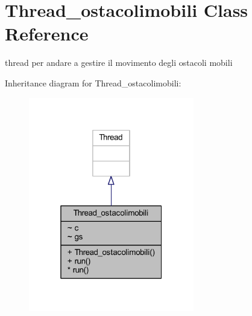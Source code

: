 \hypertarget{classcargame_1_1_thread__ostacolimobili}{}\section{Thread\+\_\+ostacolimobili Class Reference}
\label{classcargame_1_1_thread__ostacolimobili}


thread per andare a gestire il movimento degli ostacoli mobili  




Inheritance diagram for Thread\+\_\+ostacolimobili\+:
\nopagebreak
\begin{figure}[H]
\begin{center}
\leavevmode
\includegraphics[width=205pt]{classcargame_1_1_thread__ostacolimobili__inherit__graph}
\end{center}
\end{figure}


